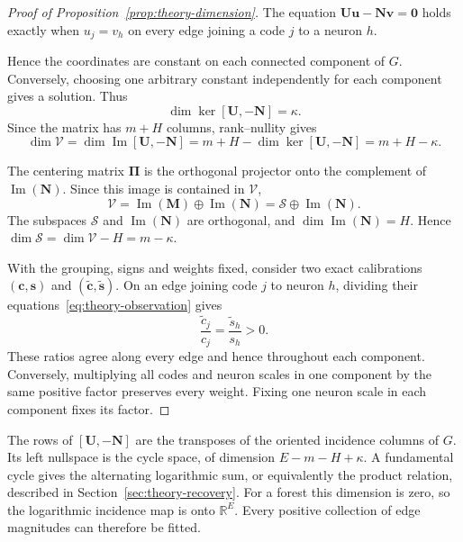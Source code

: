 \begin{proof}[Proof of Proposition~\ref{prop:theory-dimension}]
    The equation $\mathbf U\mathbf u-\mathbf N\mathbf v=\mathbf0$
    holds exactly when $u_j=v_h$ on every edge joining a code $j$
    to a neuron $h$.

    Hence the coordinates are constant on each connected component
    of $G$. Conversely, choosing one arbitrary constant
    independently for each component gives a solution. Thus
    $$
        \dim\ker[\mathbf U,-\mathbf N]=\kappa.
    $$
    Since the matrix has $m+H$ columns, rank--nullity gives
    $$
        \dim\mathcal V
        =\dim\operatorname{Im}[\mathbf U,-\mathbf N]
        =m+H-\dim\ker[\mathbf U,-\mathbf N]
        =m+H-\kappa.
    $$

    The centering matrix $\boldsymbol\Pi$ is the orthogonal projector
    onto the complement of $\operatorname{Im}(\mathbf N)$.
    Since this image is contained in $\mathcal V$,
    \begin{equation}
        \mathcal V
        = \operatorname{Im}(\mathbf M) \mathbin{\oplus} \operatorname{Im}(\mathbf N)
        =\mathcal S
            \mathbin{\oplus}\operatorname{Im}(\mathbf N).
        \label{eq:appendix-theory-space-decomposition}
    \end{equation}
    The subspaces $\mathcal S$ and
    $\operatorname{Im}(\mathbf N)$ are orthogonal, and
    $\dim\operatorname{Im}(\mathbf N)=H$.
    Hence $\dim\mathcal S
    =\dim\mathcal V-H=m-\kappa$.

    With the grouping, signs and weights fixed, consider two exact
    calibrations $(\mathbf c,\mathbf s)$ and
    $(\widetilde{\mathbf c},\widetilde{\mathbf s})$. On an edge
    joining code $j$ to neuron $h$, dividing their
    equations~\eqref{eq:theory-observation} gives
    \begin{equation*}
        \frac{\widetilde c_j}{c_j}=\frac{\widetilde s_h}{s_h}>0.
    \end{equation*}
    These ratios agree along every edge and hence throughout each
    component. Conversely, multiplying all codes and neuron scales
    in one component by the same positive factor preserves every
    weight. Fixing one neuron scale in each component fixes its factor.

\end{proof}

The rows of $[\mathbf U,-\mathbf N]$ are the transposes
of the oriented incidence columns of $G$.
Its left nullspace is the cycle space, of dimension
$E-m-H+\kappa$. A fundamental cycle gives the alternating
logarithmic sum, or equivalently the product relation, described
in Section~\ref{sec:theory-recovery}.
For a forest this dimension is zero, so the logarithmic incidence
map is onto $\mathbb R^E$. Every positive collection of edge
magnitudes can therefore be fitted.

